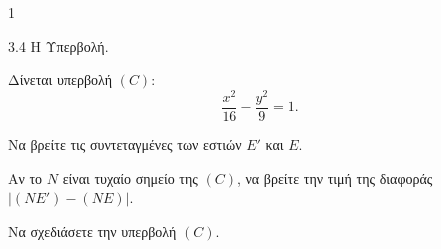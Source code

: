 \begin{ylh}{1}
    \item 3.4 Η Υπερβολή.
\end{ylh}
Δίνεται υπερβολή $(C):$
\[ \frac{x^2}{16} - \frac{y^2}{9} = 1. \]
\begin{alist}
\item Να βρείτε τις συντεταγμένες των εστιών $E'$ και $E$.  
\item Αν το $N$ είναι τυχαίο σημείο της $(C)$, να βρείτε την τιμή της διαφοράς $|(NE') - (NE)|$.  
\item Να σχεδιάσετε την υπερβολή $(C)$.  
\end{alist}